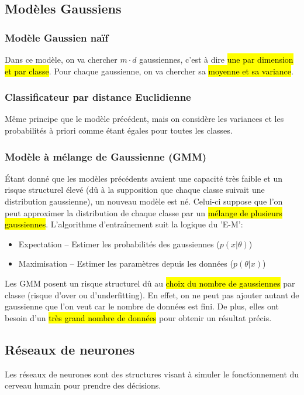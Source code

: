\documentclass[letterpaper, 12pt]{article}
\newcommand{\alinea}{
\hspace*{0.5cm}}
\begin{document}
		\subsection{Modèles Gaussiens}
			\subsubsection{Modèle Gaussien naïf}
				\alinea Dans ce modèle, on va chercher $m \cdot d$ gaussiennes, c'est à dire \hl{une par dimension et par classe}.
					Pour chaque gaussienne, on va chercher sa \hl{moyenne et sa variance}.
			\subsubsection{Classificateur par distance Euclidienne}
				\alinea Même principe que le modèle précédent, mais on considère les variances et les probabilités à priori comme 
					étant égales pour toutes les classes.
			\subsubsection{Modèle à mélange de Gaussienne (GMM)}
				\alinea \'Etant donné que les modèles précédents avaient une capacité très faible et un risque structurel élevé (dû
					à la supposition que chaque classe suivait une distribution gaussienne), un nouveau modèle est né.
					Celui-ci suppose que l'on peut approximer la distribution de chaque classe par un \hl{mélange de plusieurs gaussiennes}.
					L'algorithme d'entraînement suit la logique du 'E-M':
					\begin{itemize}
						\setlength\itemsep{0cm}
						\item Expectation -- Estimer les probabilités des gaussiennes ($p(x|\theta)$)
						\item Maximisation -- Estimer les paramètres depuis les données ($p(\theta|x)$)
					\end{itemize}
				\alinea Les GMM posent un risque structurel dû au \hl{choix du nombre de gaussiennes} par classe (risque d'over 
					ou d'underfitting). En effet, on ne peut pas ajouter autant de gaussienne que l'on veut car le nombre de données
					est fini. De plus, elles ont besoin d'un \hl{très grand nombre de données} pour obtenir un résultat précis.
		\pagebreak
		\subsection{Réseaux de neurones}
			\alinea Les réseaux de neurones sont des structures visant à simuler le fonctionnement du cerveau humain pour prendre
				des décisions. 
\end{document}
